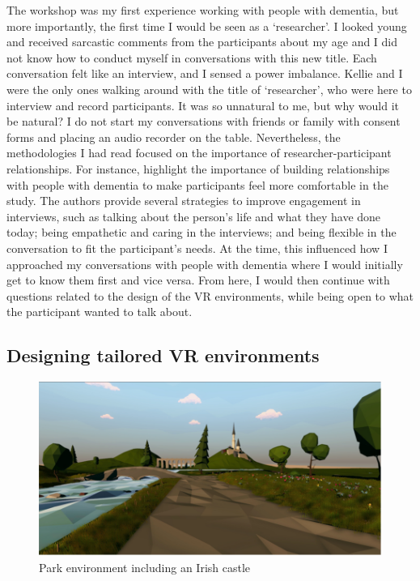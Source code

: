 The workshop was my first experience working with people with dementia, but more importantly, the first time I would be seen as a `researcher'. I looked young and received sarcastic comments from the participants about my age and I did not know how to conduct myself in conversations with this new title. Each conversation felt like an interview, and I sensed a power imbalance. Kellie and I were the only ones walking around with the title of `researcher', who were here to interview and record participants. It was so unnatural to me, but why would it be natural? I do not start my conversations with friends or family with consent forms and placing an audio recorder on the table. Nevertheless, the methodologies I had read focused on the importance of researcher-participant relationships. For instance, \cite{mckillop2004make} highlight the importance of building relationships with people with dementia to make participants feel more comfortable in the study. The authors provide several strategies to improve engagement in interviews, such as talking about the person's life and what they have done today; being empathetic and caring in the interviews; and being flexible in the conversation to fit the participant's needs. At the time, this influenced how I approached my conversations with people with dementia where I would initially get to know them first and vice versa. From here, I would then continue with questions related to the design of the VR environments, while being open to what the participant wanted to talk about.

\subsection{Designing tailored VR environments}
\label{S1:VREnvrionments}

\begin{figure}
\centering
\includegraphics[width=.8\linewidth]{Images/ChapterFour/IrishCastlVR.png}
\caption{Park environment including an Irish castle}
\label{fig:IrishCastle}
\end{figure}


